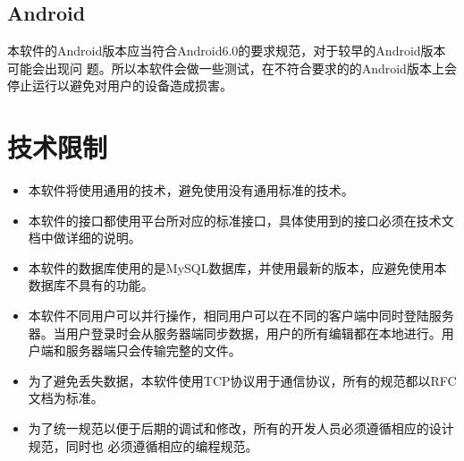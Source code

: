 \subsection{Android}
本软件的Android版本应当符合Android6.0的要求规范，对于较早的Android版本可能会出现问
题。所以本软件会做一些测试，在不符合要求的的Android版本上会停止运行以避免对用户的设备造成损害。


\section{技术限制}
\begin{itemize}
\item 本软件将使用通用的技术，避免使用没有通用标准的技术。
\item 本软件的接口都使用平台所对应的标准接口，具体使用到的接口必须在技术文档中做详细的说明。
\item 本软件的数据库使用的是MySQL数据库，并使用最新的版本，应避免使用本数据库不具有的功能。
\item 本软件不同用户可以并行操作，相同用户可以在不同的客户端中同时登陆服务器。当用户登录时会从服务器端同步数据，用户的所有编辑都在本地进行。用户端和服务器端只会传输完整的文件。
\item 为了避免丢失数据，本软件使用TCP协议用于通信协议，所有的规范都以RFC文档为标准。
\item 为了统一规范以便于后期的调试和修改，所有的开发人员必须遵循相应的设计规范，同时也 必须遵循相应的编程规范。
\end{itemize}
